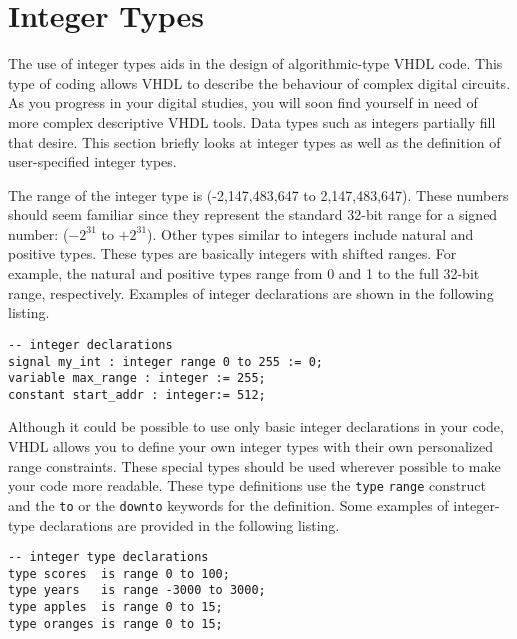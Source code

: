 \section{Integer Types}
The use of integer types aids in the design of algorithmic-type VHDL code. This type of coding allows VHDL to describe the behaviour of complex digital circuits. As you progress in your digital studies, you will soon find yourself in need of more complex descriptive VHDL tools. Data types such as integers partially fill that desire. This section briefly looks at integer types as well as the definition of user-specified integer types.

The range of the integer type is (-2,147,483,647 to 2,147,483,647). These numbers should seem familiar since they represent the standard 32-bit range for a signed number: ($-2^{31}$ to $+2^{31}$). Other types similar to integers include natural and positive types. These types are basically integers with shifted ranges. For example, the natural and positive types range from 0 and 1 to the full 32-bit range, respectively. Examples of integer declarations are shown in the following listing.
\vspace{8pt}

\begin{minipage}{0.99\linewidth}
\begin{lstlisting}
-- integer declarations
signal my_int : integer range 0 to 255 := 0;
variable max_range : integer := 255;
constant start_addr : integer:= 512;
\end{lstlisting}
\end{minipage}

Although it could be possible to use only basic integer declarations in your code, VHDL allows you to define your own integer types with their own personalized range constraints. These special types should be used wherever possible to make your code more readable. These type definitions use the \texttt{type} \texttt{range} construct and the \texttt{to} or the \texttt{downto} keywords for the definition. Some examples of integer-type declarations are provided in the following listing.
\vspace{8pt}

\begin{minipage}{0.99\linewidth}
\begin{lstlisting}
-- integer type declarations
type scores  is range 0 to 100; 
type years   is range -3000 to 3000; 
type apples  is range 0 to 15; 
type oranges is range 0 to 15; 
\end{lstlisting}
\end{minipage}

